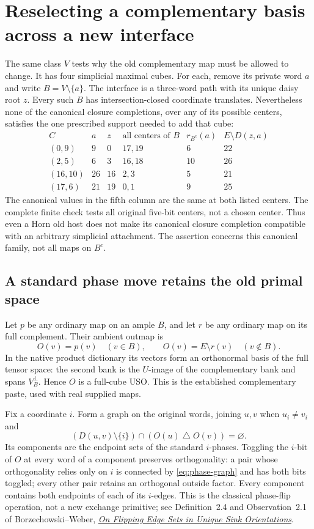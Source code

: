 \documentclass[11pt]{article}
\theoremstyle{definition}
\begin{document}
\section{Reselecting a complementary basis across a new interface}
\label{sec:reselecting}
The same class $V$ tests why the old complementary map must be allowed
to change. It has four simplicial maximal cubes. For each, remove its
private word $a$ and write $B=V\setminus\{a\}$. The interface is a
three-word path with its unique daisy root $z$. Every such $B$ has
intersection-closed coordinate translates. Nevertheless none of the
canonical closure completions, over any of its possible centers, satisfies
the one prescribed support needed to add that cube:
\[
\begin{array}{c|r|r|c|r|r}
 C &a&z&\text{all centers of }B&r_{B^c}(a)&E\setminus D(z,a)\\\hline
 (0,9)&9&0&17,19&6&22\\
 (2,5)&6&3&16,18&10&26\\
 (16,10)&26&16&2,3&5&21\\
 (17,6)&21&19&0,1&9&25
\end{array}
\]
The canonical values in the fifth column are the same at both listed
centers. The complete finite check tests all original five-bit centers,
not a chosen center. Thus even a Horn old host does not make its canonical
closure completion compatible with an arbitrary simplicial attachment.
The assertion concerns this canonical family, not all maps on $B^c$.

\subsection{A standard phase move retains the old primal space}
Let $p$ be any ordinary map on an ample $B$, and let $r$ be any ordinary
map on its full complement. Their ambient outmap is
\[
 O(v)=p(v)\quad(v\in B),\qquad O(v)=E\setminus r(v)\quad(v\notin B).
\]
In the native product dictionary its vectors form an orthonormal basis
of the full tensor space: the second bank is the $U$-image of the
complementary bank and spans $V_B^\perp$. Hence $O$ is a full-cube USO.
This is the established complementary paste, used with real supplied maps.

Fix a coordinate $i$. Form a graph on the original words, joining $u,v$
when $u_i\ne v_i$ and
\begin{equation}\label{eq:phase-graph}
 (D(u,v)\setminus\{i\})\cap(O(u)\mathbin\triangle O(v))=\varnothing.
\end{equation}
Its components are the endpoint sets of the standard $i$-phases.
Toggling the $i$-bit of $O$ at every word of a component preserves
orthogonality: a pair whose orthogonality relies only on $i$ is connected
by \eqref{eq:phase-graph} and has both bits toggled; every other pair
retains an orthogonal outside factor. Every component contains both
endpoints of each of its $i$-edges. This is the classical phase-flip
operation, not a new exchange primitive; see Definition~2.4 and
Observation~2.1 of Borzechowski--Weber,
\href{https://doi.org/10.1007/s00373-025-02929-2}
{\emph{On Flipping Edge Sets in Unique Sink Orientations}}.
\end{document}

